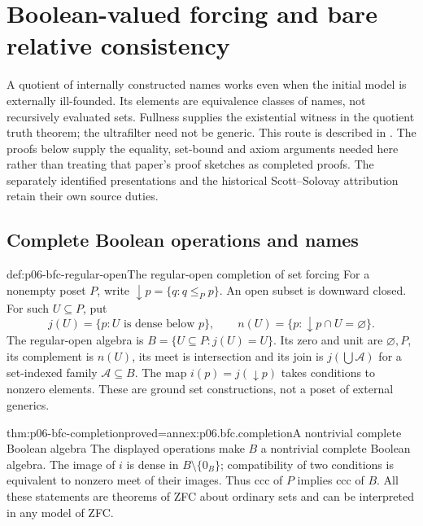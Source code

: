 \section{Boolean-valued forcing and bare relative consistency}
\label{sec:p06-boolean-forcing-consistency}

A quotient of internally constructed names works even when the initial
model is externally ill-founded. Its elements are equivalence classes of
names, not recursively evaluated sets. Fullness supplies the existential
witness in the quotient truth theorem; the ultrafilter need not be generic.
This route is described in
\cite[Lemmas~1--2 and~10]{HamkinsSeabold2012BooleanV1}.
The proofs below supply the equality, set-bound and axiom arguments needed
here rather than treating that paper's proof sketches as completed proofs.
The separately identified \cite{Bell2005,Jech2003,Kunen2011} presentations
and the historical Scott--Solovay attribution retain their own source duties.

\subsection{Complete Boolean operations and names}

\begin{hbdefinition}{def:p06-bfc-regular-open}{The regular-open completion of set forcing}
For a nonempty poset \(P\), write \(\downarrow p=\{q:q\leq_P p\}\).
An open subset is downward closed. For such \(U\subseteq P\), put
\[
 j(U)=\{p:U\text{ is dense below }p\},\qquad
 n(U)=\{p:\downarrow p\cap U=\varnothing\}.
\]
The regular-open algebra is \(B=\{U\subseteq P:j(U)=U\}\).
Its zero and unit are \(\varnothing,P\), its complement is \(n(U)\),
its meet is intersection and its join is \(j(\bigcup\mathcal A)\)
for a set-indexed family \(\mathcal A\subseteq B\).
The map \(i(p)=j(\downarrow p)\) takes conditions to nonzero elements.
These are ground set constructions, not a poset of external generics.
\end{hbdefinition}

\begin{hbtheorem}{thm:p06-bfc-completion}{proved=annex:p06.bfc.completion}{A nontrivial complete Boolean algebra}
The displayed operations make \(B\) a nontrivial complete Boolean algebra.
The image of \(i\) is dense in \(B\setminus\{0_B\}\); compatibility of
two conditions is equivalent to nonzero meet of their images. Thus ccc of
\(P\) implies ccc of \(B\). All these statements are theorems of ZFC
about ordinary sets and can be interpreted in any model of ZFC.
\end{hbtheorem}

